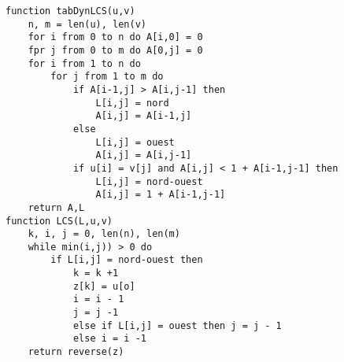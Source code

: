 \documentclass{mybourbaki}
\begin{document}

\begin{lstlisting}
function tabDynLCS(u,v)
	n, m = len(u), len(v)
	for i from 0 to n do A[i,0] = 0
	fpr j from 0 to m do A[0,j] = 0
	for i from 1 to n do
		for j from 1 to m do
			if A[i-1,j] > A[i,j-1] then
				L[i,j] = nord
				A[i,j] = A[i-1,j]
			else 
				L[i,j] = ouest
				A[i,j] = A[i,j-1]
			if u[i] = v[j] and A[i,j] < 1 + A[i-1,j-1] then
				L[i,j] = nord-ouest
				A[i,j] = 1 + A[i-1,j-1]
	return A,L
function LCS(L,u,v)
	k, i, j = 0, len(n), len(m)
	while min(i,j)) > 0 do
		if L[i,j] = nord-ouest then
			k = k +1
			z[k] = u[o]
			i = i - 1
			j = j -1 
			else if L[i,j] = ouest then j = j - 1
			else i = i -1
	return reverse(z)					
\end{lstlisting}
\end{document}
